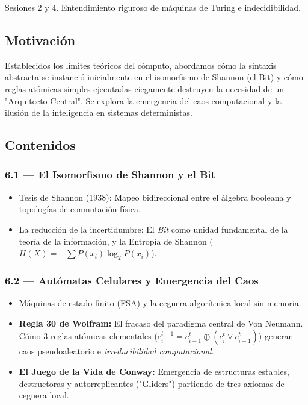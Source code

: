 \documentclass[11pt, letterpaper]{article}
\begin{document}
\begin{prereqs}
Sesiones 2 y 4. Entendimiento riguroso de m\'aquinas de Turing e indecidibilidad.
\end{prereqs}

\subsection*{Motivaci\'on}
Establecidos los l\'imites te\'oricos del c\'omputo, abordamos cómo la sintaxis abstracta se instanció inicialmente en el isomorfismo de Shannon (el Bit) y cómo reglas atómicas simples ejecutadas ciegamente destruyen la necesidad de un "Arquitecto Central". Se explora la emergencia del caos computacional y la ilusión de la inteligencia en sistemas deterministas.

\subsection{Contenidos}

\subsubsection{6.1 --- El Isomorfismo de Shannon y el Bit}
\begin{itemize}
  \item Tesis de Shannon (1938): Mapeo bidireccional entre el \'algebra booleana y topolog\'ias de conmutaci\'on f\'isica.
  \item La reducci\'on de la incertidumbre: El \emph{Bit} como unidad fundamental de la teor\'ia de la informaci\'on, y la Entrop\'ia de Shannon ($H(X) = - \sum P(x_i) \log_2 P(x_i)$).
\end{itemize}

\subsubsection{6.2 --- Aut\'omatas Celulares y Emergencia del Caos}
\begin{itemize}
  \item M\'aquinas de estado finito (FSA) y la ceguera algor\'itmica local sin memoria.
  \item \textbf{Regla 30 de Wolfram:} El fracaso del paradigma central de Von Neumann. C\'omo 3 reglas at\'omicas elementales ($c_i^{t+1} = c_{i-1}^t \oplus (c_i^t \lor c_{i+1}^t)$) generan caos pseudoaleatorio e \emph{irreducibilidad computacional}.
  \item \textbf{El Juego de la Vida de Conway:} Emergencia de estructuras estables, destructoras y autorreplicantes ("Gliders") partiendo de tres axiomas de ceguera local.
\end{itemize}
\end{document}
